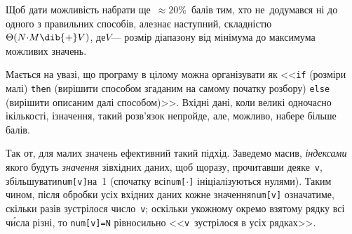 Щоб дати можливість набрати ще~${\approx}20$\%~балів тим, хто не~додумався ні до одного з правильних способів, але\nolinebreak[3] знає наступний, складністю $\Theta(N{\cdot}M\dib{{+}}V)$, де\nolinebreak[3] $V$\nolinebreak[3] --- розмір діапазону від мінімума до максимума можливих значень.

Мається на увазі, що програму в цілому можна організувати як <<\texttt{if} (розміри малі) \texttt{then} (вирішити способом згаданим на самому початку розбору) \texttt{else} (вирішити описаним далі способом)>>. Вхідні дані, коли великі одночасно і\nolinebreak[3] кількості, і\nolinebreak[3] значення, такий розв'язок не\nolinebreak[3] пройде, але, можливо, набере більше балів.

Так от, для малих значень ефективний такий підхід. Заведемо масив, \emph{індексами} якого будуть \emph{значення} зі\nolinebreak[3] вхідних даних, щоб щоразу, прочитавши деяке~\texttt{v}, збільшувати\nolinebreak[2] \texttt{num[v]}\nolinebreak[2] на~1 (спочатку всі\nolinebreak[3] \texttt{num[$\cdot$]} ініціалізуються нулями). Таким чином, після обробки усіх вхідних даних кожне значення\nolinebreak[2] \texttt{num[v]} означатиме, скільки разів зустрілося число~\texttt{v}; оскільки у\nolinebreak[3] кожному окремо взятому рядку всі ч\'{и}сла різні, то \mbox{\texttt{num[v]=N}} рівносильно <<\texttt{v}~зустрілося в усіх рядках>>.\label{text:omnipresent-numbers-end}

